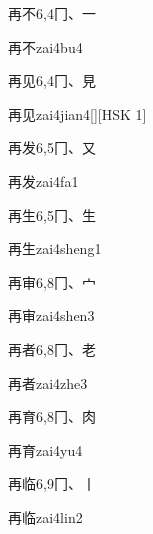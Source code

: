 \begin{entry}{再不}{6,4}{⼌、⼀}
  \begin{phonetics}{再不}{zai4bu4}
  \end{phonetics}
\end{entry}

\begin{entry}{再见}{6,4}{⼌、⾒}
  \begin{phonetics}{再见}{zai4jian4}[][HSK 1]
  \end{phonetics}
\end{entry}

\begin{entry}{再发}{6,5}{⼌、⼜}
  \begin{phonetics}{再发}{zai4fa1}
  \end{phonetics}
\end{entry}

\begin{entry}{再生}{6,5}{⼌、⽣}
  \begin{phonetics}{再生}{zai4sheng1}
  \end{phonetics}
\end{entry}

\begin{entry}{再审}{6,8}{⼌、⼧}
  \begin{phonetics}{再审}{zai4shen3}
  \end{phonetics}
\end{entry}

\begin{entry}{再者}{6,8}{⼌、⽼}
  \begin{phonetics}{再者}{zai4zhe3}
  \end{phonetics}
\end{entry}

\begin{entry}{再育}{6,8}{⼌、⾁}
  \begin{phonetics}{再育}{zai4yu4}
  \end{phonetics}
\end{entry}

\begin{entry}{再临}{6,9}{⼌、⼁}
  \begin{phonetics}{再临}{zai4lin2}
  \end{phonetics}
\end{entry}


